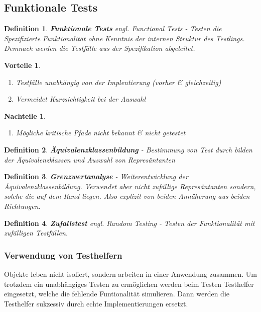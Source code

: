 \documentclass[a4paper]{article}
\theoremstyle{break}
\newtheorem{defi}{Definition}[section]
\newtheorem{why}{Vorteile}[section]
\newtheorem{whynot}{Nachteile}[section]
\begin{document}
        \subsection{Funktionale Tests}
        \begin{defi}
          \textbf{Funktionale Tests} \textit{engl. Functional Tests} - Testen die Spezifizierte Funktionalität ohne Kenntnis der internen Struktur des Testlings. Demnach werden die Testf\"alle aus der Spezifikation abgeleitet.
        \end{defi}
        \begin{why}
          \begin{enumerate}
          \item Testf\"alle unabh\"angig von der Implentierung (vorher \& gleichzeitig)
          \item Vermeidet Kurzsichtigkeit bei der Auswahl
          \end{enumerate}
        \end{why}
        \begin{whynot}
          \begin{enumerate}
          \item M\"ogliche kritische Pfade nicht bekannt \& nicht getestet
          \end{enumerate}
        \end{whynot}

        \begin{defi}
          \textbf{\"Aquivalenzklassenbildung} - Bestimmung von Test durch bilden der \"Aquivalenzklassen und Auswahl von Repres\"antanten
        \end{defi}

        \begin{defi}
          \textbf{Grenzwertanalyse} - Weiterentwicklung der \"Aquivalenzklassenbildung. Verwendet aber nicht zuf\"allige Repres\"antanten sondern, solche die auf dem Rand liegen.
          Also explizit von beiden Ann\"aherung aus beiden Richtungen.
        \end{defi}

        \begin{defi}
          \textbf{Zufallstest} \textit{engl. Random Testing} - Testen der Funktionalität mit zuf\"alligen Testf\"allen.
        \end{defi}

        \subsubsection{Verwendung von Testhelfern}
        Objekte leben nicht isoliert, sondern arbeiten in einer Anwendung zusammen. Um trotzdem ein unabh\"angiges Testen zu erm\"oglichen werden beim Testen Testhelfer eingesetzt, welche die fehlende Funtionalit\"at simulieren. Dann werden die Testhelfer sukzessiv durch echte Implementierungen ersetzt.
\end{document}
